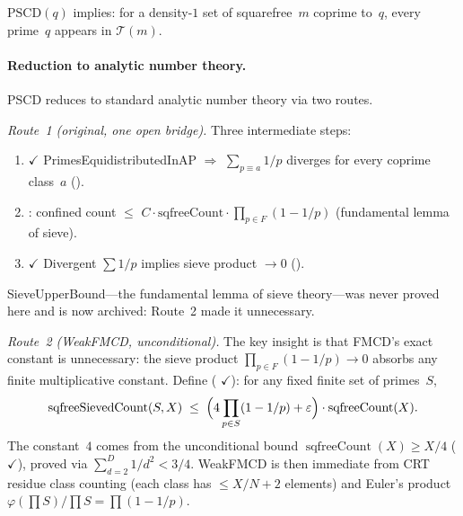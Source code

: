 \begin{theorem}
\label{thm:almost-all-mixed}
$\mathrm{PSCD}(q)$ implies: for a density-$1$ set of squarefree~$m$
coprime to~$q$, every prime~$q$ appears in $\mathcal{T}(m)$.
\end{theorem}

\paragraph{Reduction to analytic number theory.}
PSCD reduces to standard analytic number theory via two routes.

\smallskip\noindent
\emph{Route~1 (original, one open bridge).}\enspace
Three intermediate steps:
\begin{enumerate}[nosep]
\item {\color{leanink}$\checkmark$}\enspace
  PrimesEquidistributedInAP $\Rightarrow$ $\sum_{p \equiv a} 1/p$ diverges
  for every coprime class~$a$
  ().
\item {}: confined count $\leq$ $C \cdot
  \text{sqfreeCount} \cdot \prod_{p \in F} (1 - 1/p)$
  (fundamental lemma of sieve).
\item {\color{leanink}$\checkmark$}\enspace
  Divergent $\sum 1/p$ implies sieve product $\to 0$
  ().
\end{enumerate}
SieveUpperBound---the fundamental lemma of sieve theory---was never
proved here and is now archived: Route~2 made it unnecessary.

\smallskip\noindent
\emph{Route~2 (WeakFMCD, unconditional).}\enspace
The key insight is that FMCD's exact constant is unnecessary:
the sieve product $\prod_{p \in F}(1-1/p) \to 0$ absorbs any
finite multiplicative constant.  Define 
(
{\color{leanink}$\checkmark$}):
for any fixed finite set of primes~$S$,
\[
  \operatorname{sqfreeSievedCount}(S,X) \;\leq\;
  \Bigl(4\prod_{p \in S}(1 - 1/p) + \varepsilon\Bigr)
  \cdot \operatorname{sqfreeCount}(X).
\]
The constant~$4$ comes from the unconditional bound
$\operatorname{sqfreeCount}(X) \geq X/4$
(
{\color{leanink}$\checkmark$}), proved via $\sum_{d=2}^{D}1/d^2 < 3/4$.
WeakFMCD is then immediate from CRT residue class counting
(each class has $\leq X/N + 2$ elements) and Euler's product
$\varphi(\prod S)/\prod S = \prod(1-1/p)$.

